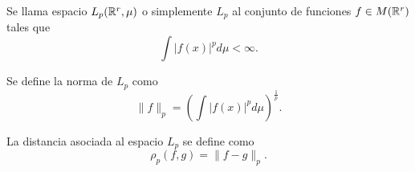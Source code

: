 %
\begin{definicion}[Espacios Lp]
    Se llama espacio $L_p(\mathbb{R}^r, \mu)$ o simplemente $L_p$ al conjunto 
    de funciones $f \in M(\mathbb{R}^r)$ tales que 
    \begin{equation}
        \int |f(x)|^p d\mu < \infty. 
    \end{equation}

Se define la norma de $L_p$ como 
\begin{equation}
    \| f\|_p 
    =
    \left(\int |f(x)|^p d\mu \right)^\frac{1}{p}.
\end{equation}

La distancia asociada al espacio $L_p$ se define como 
\begin{equation}
    \rho_p(f,g) = \| f-g\|_p.
\end{equation}
\end{definicion}

